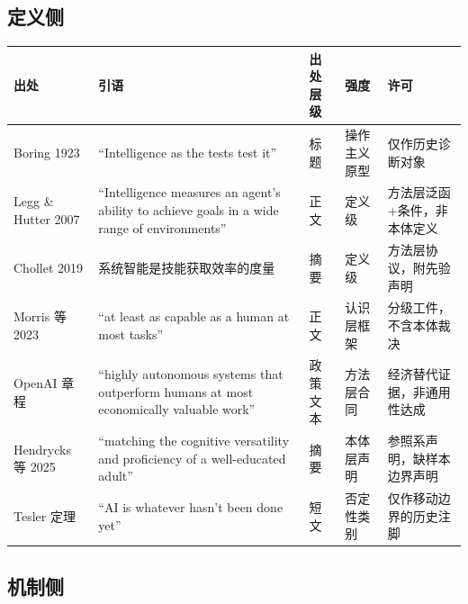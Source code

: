 \documentclass[10pt,fontset=fandol]{ctexart}
\begin{document}
\subsection{定义侧}

\begin{longtable}{p{3.4cm} p{4.6cm} p{1.6cm} p{1.6cm} p{3.4cm}}
\toprule
出处 & 引语 & 出处层级 & 强度 & 许可 \\
\midrule
\endhead
Boring 1923\cite{boring1923intelligence} & ``Intelligence as the tests test it'' & 标题 & 操作主义原型 & 仅作历史诊断对象 \\
Legg \& Hutter 2007\cite{legg2007universal} & ``Intelligence measures an agent's ability to achieve goals in a wide range of environments'' & 正文 & 定义级 & 方法层泛函+条件，非本体定义 \\
Chollet 2019\cite{chollet2019measure} & 系统智能是技能获取效率的度量 & 摘要 & 定义级 & 方法层协议，附先验声明 \\
Morris 等 2023\cite{morris2023levels} & ``at least as capable as a human at most tasks'' & 正文 & 认识层框架 & 分级工件，不含本体裁决 \\
OpenAI 章程\cite{openai2018charter} & ``highly autonomous systems that outperform humans at most economically valuable work'' & 政策文本 & 方法层合同 & 经济替代证据，非通用性达成 \\
Hendrycks 等 2025\cite{hendrycks2025definition} & ``matching the cognitive versatility and proficiency of a well-educated adult'' & 摘要 & 本体层声明 & 参照系声明，缺样本边界声明 \\
Tesler 定理\cite{tesler1997effect} & ``AI is whatever hasn't been done yet'' & 短文 & 否定性类别 & 仅作移动边界的历史注脚 \\
\bottomrule
\end{longtable}

\subsection{机制侧}
\end{document}

